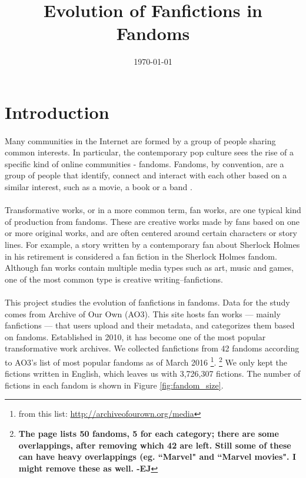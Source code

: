 \documentclass[11pt]{article} %
\def\ej#1{\footnote{\color{blue}\textbf{#1 -EJ}} }
\begin{document}

\title{Evolution of Fanfictions in Fandoms} %
\date{\today}
\maketitle %

\section{Introduction} %
\label{sec:introduction}
\paragraph{} Many communities in the Internet are formed by a group of people sharing common interests. In particular, the contemporary pop culture sees the rise of a specific kind of online communities - fandoms. Fandoms, by convention, are a group of people that identify, connect and interact with each other based on a similar interest, such as a movie, a book or a band \cite{wiki:fandom}. 

\paragraph{}Transformative works, or in a more common term, fan works, are one typical kind of production from fandoms\cite{wiki:transf_work}. These are creative works made by fans based on one or more original works, and are often centered around certain characters or story lines. For example, a story written by a contemporary fan about Sherlock Holmes in his retirement is considered a fan fiction in the Sherlock Holmes fandom. Although fan works contain multiple media types such as art, music and games, one of the most common type is creative writing--fanfictions.

\paragraph{} This project studies the evolution of fanfictions in fandoms. Data for the study comes from Archive of Our Own (AO3). This site hosts fan works --- mainly fanfictions --- that users upload and their metadata, and categorizes them based on fandoms. Established in 2010, it has become one of the most popular transformative work archives. We collected fanfictions from 42 fandoms according to AO3's list of most popular fandoms as of March 2016 \footnote{from this list: \url{http://archiveofourown.org/media}}. \ej{The page lists 50 fandoms, 5 for each category; there are some overlappings, after removing which 42 are left. Still some of these can have heavy overlappings (eg. ``Marvel" and ``Marvel movies". I might remove these as well.}
We only kept the fictions written in English, which leaves us with 3,726,307 fictions. The number of fictions in each fandom is shown in Figure \ref{fig:fandom_size}.
\end{document}

